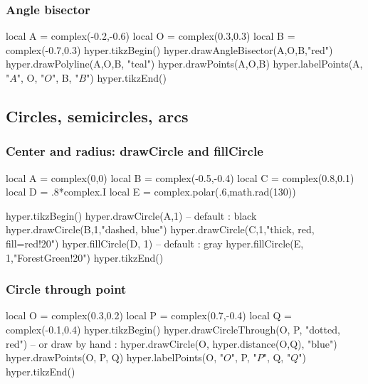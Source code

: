 \documentclass{article}
\begin{document}
\subsubsection{Angle bisector}
\begin{codeandresult}
\begin{luacode*}
local A = complex(-0.2,-0.6)
local O = complex(0.3,0.3)
local B = complex(-0.7,0.3)
hyper.tikzBegin()
hyper.drawAngleBisector(A,O,B,"red")
hyper.drawPolyline(A,O,B, "teal")
hyper.drawPoints(A,O,B)
hyper.labelPoints(A, "$A$", O, "$O$", B, "$B$")
hyper.tikzEnd()
\end{luacode*}
\end{codeandresult}

\subsection{Circles, semicircles, arcs}

\subsubsection{Center and radius: drawCircle and fillCircle}
 
\begin{codeandresult}
\begin{luacode*}
local A = complex(0,0)
local B = complex(-0.5,-0.4)
local C = complex(0.8,0.1)
local D = .8*complex.I
local E = complex.polar(.6,math.rad(130))

hyper.tikzBegin()
hyper.drawCircle(A,1) -- default : black
hyper.drawCircle(B,1,"dashed, blue")
hyper.drawCircle(C,1,"thick, red, fill=red!20")
hyper.fillCircle(D, 1) -- default : gray
hyper.fillCircle(E, 1,"ForestGreen!20")
hyper.tikzEnd()
\end{luacode*}
\end{codeandresult}


\subsubsection{Circle through point}
\begin{codeandresult}
\begin{luacode*}
local O = complex(0.3,0.2)
local P = complex(0.7,-0.4)
local Q = complex(-0.1,0.4)
hyper.tikzBegin()
hyper.drawCircleThrough(O, P, "dotted, red")
-- or draw by hand : 
hyper.drawCircle(O, hyper.distance(O,Q), "blue")
hyper.drawPoints(O, P, Q)
hyper.labelPoints(O, "$O$", P, "$P$", Q, "$Q$")
hyper.tikzEnd()
\end{luacode*}
\end{codeandresult}
\end{document}
